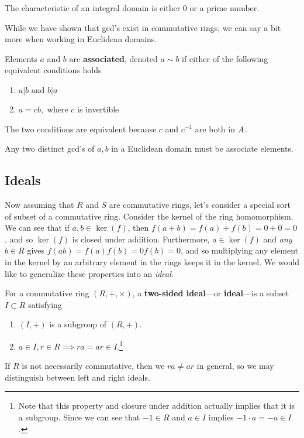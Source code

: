   \begin{theorem}
    The characteristic of an integral domain is either $0$ or a prime number. 
  \end{theorem}

  While we have shown that gcd's exist in commutative rings, we can say a bit more when working in Euclidean domains. 

  \begin{definition}
    Elements $a$ and $b$ are \textbf{associated}, denoted $a \sim b$ if either of the following equivalent conditions holds
    \begin{enumerate}
        \item $a | b \text{ and } b | a$
        \item $a = c b, \text{ where } c$ is invertible
    \end{enumerate}
    The two conditions are equivalent because $c$ and $c^{-1}$ are both in $A$. 
  \end{definition} 

  \begin{theorem}
    Any two distinct gcd's of $a, b$ in a Euclidean domain must be associate elements. 
  \end{theorem}

\subsection{Ideals}

  Now assuming that $R$ and $S$ are commutative rings, let's consider a special sort of subset of a commutative ring. Consider the kernel of the ring homomorphism. We can see that if $a, b \in \ker(f)$, then $f(a + b) = f(a) + f(b) = 0 + 0 = 0$, and so $\ker(f)$ is closed under addition. Furthermore, $a \in \ker(f)$ and \textit{any} $b \in R$ gives $f(ab) = f(a) f(b) = 0 f(b) = 0$, and so multiplying any element in the kernel by an arbitrary element in the rings keeps it in the kernel. We would like to generalize these properties into an \textit{ideal}. 

  \begin{definition}[Ideals]
    For a commutative ring $(R,+, \times)$, a \textbf{two-sided ideal}---or \textbf{ideal}---is a subset $I \subset R$ satisfying 
    \begin{enumerate}
      \item $(I, +)$ is a subgroup of $(R, +)$. 
      \item $a \in I, r \in R \implies ra = ar \in I$.\footnote{Note that this property and closure under addition actually implies that it is a subgroup. Since we can see that $-1 \in R$ and $a \in I$ implies $-1 \cdot a = -a \in I$.}
    \end{enumerate}
    If $R$ is not necessarily commutative, then we $ra \neq ar$ in general, so we may distinguish between left and right ideals. 
  \end{definition}

